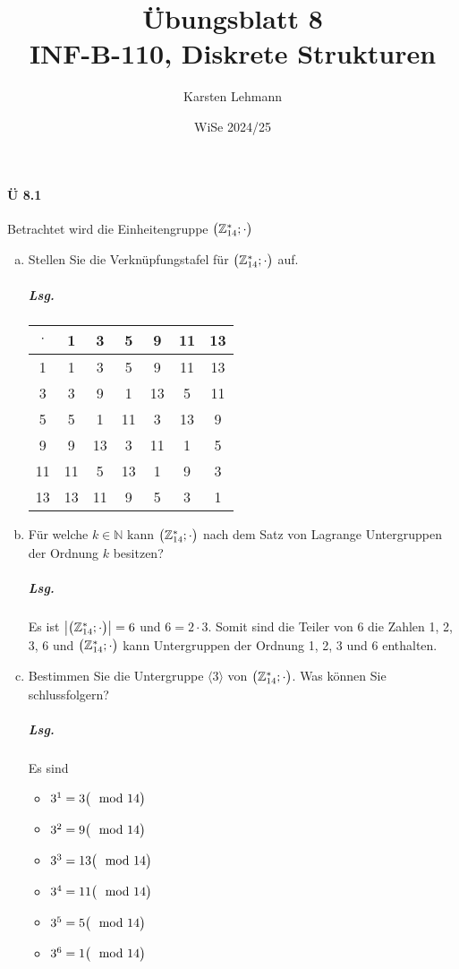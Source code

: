 \documentclass{scrreprt}
\author{Karsten Lehmann}
\date{WiSe 2024/25}
\title{Übungsblatt 8\\INF-B-110, Diskrete Strukturen}
\begin{document}
\paragraph{Ü 8.1} Betrachtet wird die Einheitengruppe
$\qty\big(\mathbb{Z}_{14}^*; \cdot)$
\begin{enumerate}[(a)]
\item Stellen Sie die Verknüpfungstafel für $\qty\big(\mathbb{Z}_{14}^*; \cdot)$
  auf.

  \subparagraph{Lsg.}\phantom{\null}

  \begin{tabular}{|c|cccccc|}
    \hline
    $\cdot$ & 1  & 3  & 5  & 9  & 11 & 13 \\
    \hline
    1       & 1  & 3  & 5  & 9  & 11 & 13 \\
    3       & 3  & 9  & 1  & 13 & 5  & 11 \\
    5       & 5  & 1  & 11 & 3  & 13 & 9  \\
    9       & 9  & 13 & 3  & 11 & 1  & 5  \\
    11      & 11 & 5  & 13 & 1  & 9  & 3  \\
    13      & 13 & 11 & 9  & 5  & 3  & 1  \\
    \hline
  \end{tabular}

\item Für welche $k \in \mathbb{N}$ kann $\qty\big(\mathbb{Z}_{14}^*; \cdot)$
  nach dem Satz von Lagrange Untergruppen der Ordnung $k$ besitzen?

  \subparagraph{Lsg.} Es ist $\abs{\qty\big(\mathbb{Z}_{14}^*; \cdot)} = 6$ und
  $6 = 2 \cdot 3$.
  Somit sind die Teiler von 6 die Zahlen 1, 2, 3, 6 und
  $\qty\big(\mathbb{Z}_{14}^*; \cdot)$ kann Untergruppen der Ordnung 1, 2, 3
  und 6 enthalten.

\item Bestimmen Sie die Untergruppe $\big\langle 3 \big\rangle$ von
  $\qty\big(\mathbb{Z}_{14}^*; \cdot)$.
  Was können Sie schlussfolgern?

  \subparagraph{Lsg.} Es sind
  \begin{itemize}
  \item $3^1 = 3 \qty\big(\mod 14)$
  \item $3^2 = 9 \qty\big(\mod 14)$
  \item $3^3 = 13 \qty\big(\mod 14)$
  \item $3^4 = 11 \qty\big(\mod 14)$
  \item $3^5 = 5 \qty\big(\mod 14)$
  \item $3^6 = 1 \qty\big(\mod 14)$
  \end{itemize}


\end{enumerate}
\end{document}
